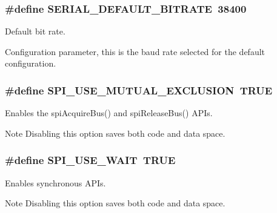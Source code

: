 \subsubsection[{S\+E\+R\+I\+A\+L\+\_\+\+D\+E\+F\+A\+U\+L\+T\+\_\+\+B\+I\+T\+R\+A\+T\+E}]{\setlength{\rightskip}{0pt plus 5cm}\#define S\+E\+R\+I\+A\+L\+\_\+\+D\+E\+F\+A\+U\+L\+T\+\_\+\+B\+I\+T\+R\+A\+T\+E~38400}\label{group___h_a_l___c_o_n_f_gacb4c08ac23f83ac9d58c50ff840de516}


Default bit rate. 

Configuration parameter, this is the baud rate selected for the default configuration. \hypertarget{group___h_a_l___c_o_n_f_ga36d1818f9631f955f7cc94629b1d5498}{}
\subsubsection[{S\+P\+I\+\_\+\+U\+S\+E\+\_\+\+M\+U\+T\+U\+A\+L\+\_\+\+E\+X\+C\+L\+U\+S\+I\+O\+N}]{\setlength{\rightskip}{0pt plus 5cm}\#define S\+P\+I\+\_\+\+U\+S\+E\+\_\+\+M\+U\+T\+U\+A\+L\+\_\+\+E\+X\+C\+L\+U\+S\+I\+O\+N~T\+R\+U\+E}\label{group___h_a_l___c_o_n_f_ga36d1818f9631f955f7cc94629b1d5498}


Enables the {\ttfamily spi\+Acquire\+Bus()} and {\ttfamily spi\+Release\+Bus()} A\+P\+Is. 

\begin{DoxyNote}{Note}
Disabling this option saves both code and data space. 
\end{DoxyNote}
\hypertarget{group___h_a_l___c_o_n_f_ga0c9ab1488423fa10a22f506c6e74b563}{}
\subsubsection[{S\+P\+I\+\_\+\+U\+S\+E\+\_\+\+W\+A\+I\+T}]{\setlength{\rightskip}{0pt plus 5cm}\#define S\+P\+I\+\_\+\+U\+S\+E\+\_\+\+W\+A\+I\+T~T\+R\+U\+E}\label{group___h_a_l___c_o_n_f_ga0c9ab1488423fa10a22f506c6e74b563}


Enables synchronous A\+P\+Is. 

\begin{DoxyNote}{Note}
Disabling this option saves both code and data space. 
\end{DoxyNote}
